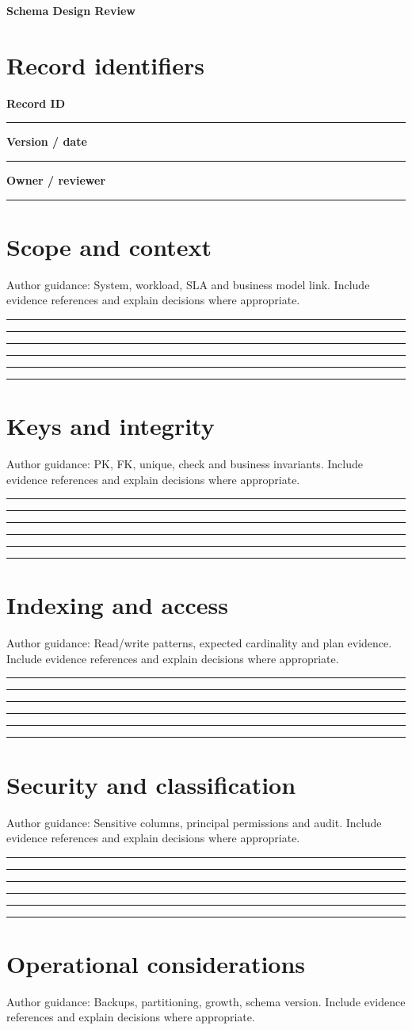 \documentclass[11pt,letterpaper]{article}
\newcommand{\ResponseLine}{\par\vspace{1.05em}\noindent\rule{\linewidth}{0.4pt}\par}
\newcommand{\ResponseArea}{\ResponseLine\ResponseLine\ResponseLine}
\begin{document}
\begin{center}
{\LARGE\bfseries\color{navy} Schema Design Review}\par
\vspace{0.25em}{\large Authoring Template | guided fields}\par
{}
\end{center}
\vspace{0.8em}
\section{Record identifiers}
\textbf{Record ID}\ResponseLine\textbf{Version / date}\ResponseLine\textbf{Owner / reviewer}\ResponseLine
\section{Scope and context}
Author guidance: System, workload, SLA and business model link. Include evidence references and explain decisions where appropriate.


\ResponseArea\ResponseArea
\section{Keys and integrity}
Author guidance: PK, FK, unique, check and business invariants. Include evidence references and explain decisions where appropriate.


\ResponseArea\ResponseArea
\section{Indexing and access}
Author guidance: Read/write patterns, expected cardinality and plan evidence. Include evidence references and explain decisions where appropriate.


\ResponseArea\ResponseArea
\section{Security and classification}
Author guidance: Sensitive columns, principal permissions and audit. Include evidence references and explain decisions where appropriate.


\ResponseArea\ResponseArea
\section{Operational considerations}
Author guidance: Backups, partitioning, growth, schema version. Include evidence references and explain decisions where appropriate.
\end{document}
